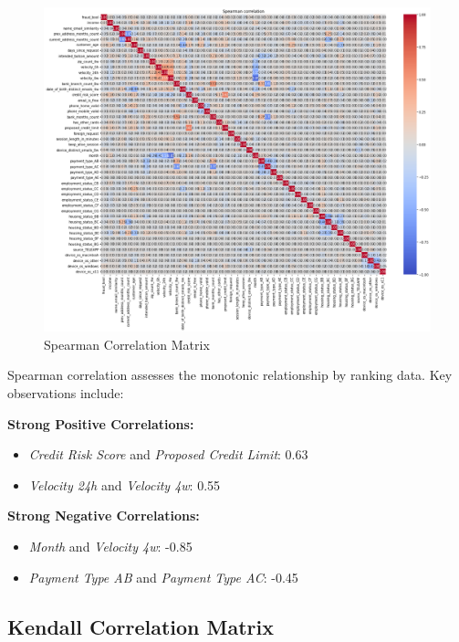 \documentclass[12pt,a4paper]{report}
\begin{document}
\begin{figure}[h]
    \centering
    \includegraphics[width=\textwidth]{spearman_corr.png}
    \caption{Spearman Correlation Matrix}
    \label{fig:spearman_corr}
\end{figure}

Spearman correlation assesses the monotonic relationship by ranking data. Key observations include:

\textbf{Strong Positive Correlations:}
\begin{itemize}
    \item \textit{Credit Risk Score} and \textit{Proposed Credit Limit}: 0.63
    \item \textit{Velocity 24h} and \textit{Velocity 4w}: 0.55
\end{itemize}

\textbf{Strong Negative Correlations:}
\begin{itemize}
    \item \textit{Month} and \textit{Velocity 4w}: -0.85
    \item \textit{Payment Type AB} and \textit{Payment Type AC}: -0.45
\end{itemize}

\subsection{Kendall Correlation Matrix}
\end{document}
